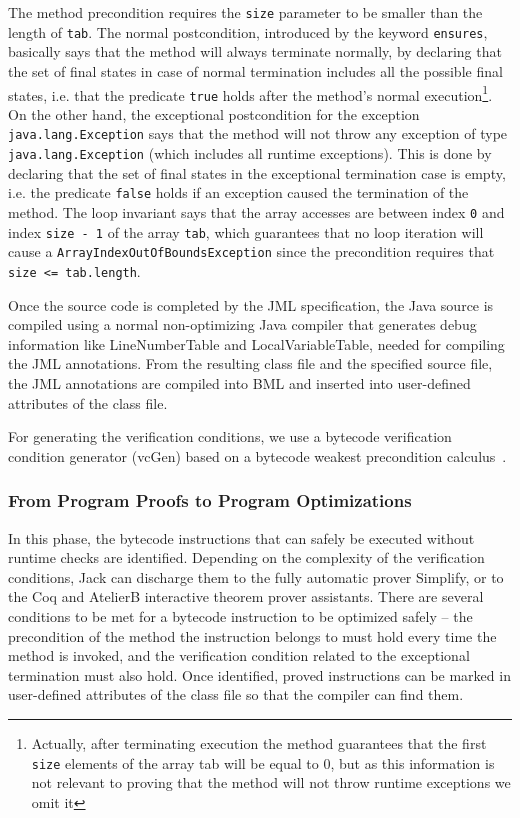 The method precondition requires the \verb!size! parameter to be smaller than the length of \verb!tab!. The normal postcondition, introduced by the keyword \verb!ensures!, basically says that the method will always terminate normally, by declaring that the set of final states in case of normal termination includes all the possible final states, i.e. that the predicate \verb!true! holds after the method's normal execution\footnote{Actually, after terminating execution the method guarantees that the first \texttt{size} elements of the array tab will be equal to 0, but as this information is not relevant to proving that the method will not throw runtime exceptions we omit it}. On the other hand, the exceptional postcondition for the exception \texttt{java.lang.Exception} says that the method will not throw any exception of type \texttt{java.lang.Exception} (which includes all runtime exceptions). This is done by declaring that the set of final states in the exceptional termination case is empty, i.e. the predicate \texttt{false} holds if an exception caused the termination of the method. The loop invariant says that the array accesses are between index \verb!0! and index \verb!size - 1! of the array \verb!tab!, which guarantees that no loop iteration will cause a \verb!ArrayIndexOutOfBoundsException! since the precondition requires that \verb!size <= tab.length!.

Once the source code is completed by the JML specification, the Java source is compiled using a normal non-optimizing Java compiler that generates debug information like \textrm{LineNumberTable} and \textrm{LocalVariableTable}, needed for compiling the JML annotations. From the resulting class file and the specified source file, the JML annotations are compiled into BML and inserted into user-defined attributes of the class file. 

For generating the verification conditions, we use a bytecode verification condition generator (vcGen) based on a bytecode weakest precondition calculus~\cite{JBL05MP}. 

\subsubsection{From Program Proofs to Program Optimizations }
\label{proofs}
In this phase, the bytecode instructions that can safely be executed without runtime checks are identified. Depending on the complexity of the verification conditions, Jack can discharge them to the fully automatic prover Simplify, or to the Coq and AtelierB interactive theorem prover assistants.
There are several conditions to be met for a bytecode instruction to be optimized safely -- the precondition of the method the instruction belongs to must hold every time the method is invoked, and the verification condition related to the exceptional termination must also hold.
Once identified, proved instructions can be marked in user-defined attributes of the class file so that the compiler can find them.

